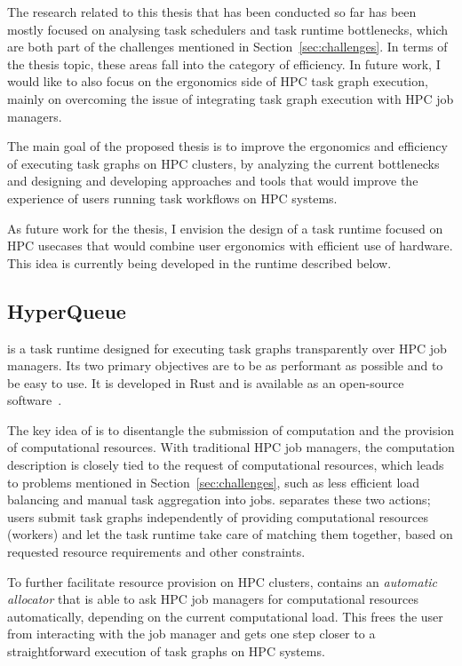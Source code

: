 The research related to this thesis that has been conducted so far has been mostly focused on
analysing task schedulers and task runtime bottlenecks, which are both part of the
challenges mentioned in Section~\ref{sec:challenges}. In terms of the thesis topic, these
areas fall into the category of efficiency. In future work, I would like to also focus on the
ergonomics side of HPC task graph execution, mainly on overcoming the issue of integrating task
graph execution with HPC job managers.

The main goal of the proposed thesis is to improve the ergonomics and efficiency of executing
task graphs on HPC clusters, by analyzing the current bottlenecks and designing and developing
approaches and tools that would improve the experience of users running task workflows on HPC
systems.

As future work for the thesis, I envision the design of a task runtime focused on HPC usecases
that would combine user ergonomics with efficient use of hardware. This idea is currently
being developed in the \hyperqueue{} runtime described below.

\subsection{HyperQueue}
\hyperqueue{} is a task runtime designed for executing task graphs transparently over HPC
job managers. Its two primary objectives are to be as performant as possible and to be easy to use.
It is developed in Rust and is available as an open-source
software~.

The key idea of \hyperqueue{} is to disentangle the submission of computation and the provision of
computational resources. With traditional HPC job managers, the computation description is
closely tied to the request of computational resources, which leads to problems mentioned in
Section~\ref{sec:challenges}, such as less efficient load balancing and manual task aggregation
into jobs. \hyperqueue{} separates these two actions; users submit task graphs independently of
providing computational resources (workers) and let the task runtime take care of matching them
together, based on requested resource requirements and other constraints.

To further facilitate resource provision on HPC clusters, \hyperqueue{} contains an
\emph{automatic allocator} that is able to ask HPC job managers for computational resources
automatically, depending on the current computational load. This frees the user from interacting
with the job manager and gets one step closer to a straightforward execution of task graphs on HPC
systems.

